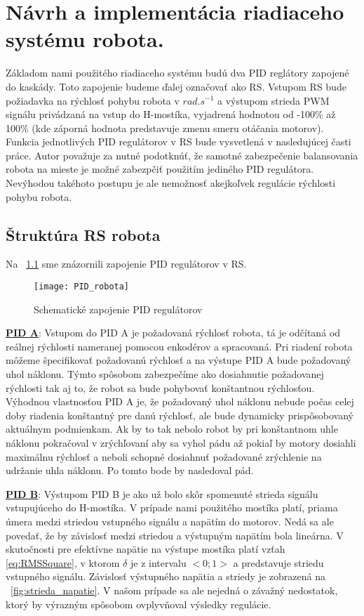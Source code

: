 \chapter{Návrh a implementácia riadiaceho systému robota.}
Základom nami použitého riadiaceho systému budú dva PID reglátory zapojené do kaskády. Toto zapojenie budeme ďalej označovať ako \ac{RS}. Vstupom RS bude požiadavka na rýchlosť pohybu robota v $rad.s^{-1}$ a výstupom strieda PWM signálu privádzaná na vstup do H-mostíka, vyjadrená hodnotou od -100\% až 100\% (kde záporná hodnota predstavuje zmenu smeru otáčania motorov). Funkcia jednotlivých PID regulátorov v RS bude vysvetlená v nasledujúcej časti práce. Autor považuje za nutné podotknúť, že samotné zabezpečenie balansovania robota na mieste je možné zabezpčiť použitím jediného PID regulátora. Nevýhodou takéhoto postupu je ale nemožnosť akejkoľvek regulácie rýchlosti pohybu robota. 

\section{Štruktúra RS robota}

Na \figurename~\ref{fig:RS} sme znázornili zapojenie PID regulátorov v RS.  

\begin{figure}
\centering
\texttt{[image: PID\_robota]}
\caption{Schematické zapojenie PID regulátorov}
\label{fig:RS}
\end{figure}

\underline{\textbf{PID A}}:
Vstupom do PID A je požadovaná rýchlosť robota, tá je odčítaná od reálnej rýchlosti nameranej pomocou enkodérov a spracovaná. Pri riadení robota môžeme špecifikovať požadovanú rýchlosť a na výstupe  PID A bude požadovaný uhol náklonu. Týmto spôsobom zabezpečíme ako dosiahnutie požadovanej rýchlosti tak aj to, že robot sa bude pohybovať konštantnou rýchlosťou. Výhodnou vlastnosťou PID A je, že požadovaný uhol náklonu nebude počas celej doby riadenia konštantný pre danú rýchlosť, ale bude dynamicky prispôsobovaný aktuálnym podmienkam. Ak by to tak nebolo robot by pri konštantnom uhle náklonu pokračoval v zrýchľovaní aby sa vyhol pádu až pokiaľ by motory dosiahli maximálnu rýchlosť a neboli schopné dosiahnuť požadované zrýchlenie na udržanie uhla náklonu. Po tomto bode by nasledoval pád.

\underline{\textbf{PID B}}:
Výstupom PID B je ako už bolo skôr spomenuté strieda signálu vstupujúceho do H-mostíka. V prípade nami použitého mostíka platí, priama úmera medzi striedou vstupného signálu a napätím do motorov. Nedá sa ale povedať, že by závislosť medzi striedou a výstupným napätím bola lineárna. V skutočnosti pre efektívne napätie na výstupe mostíka platí vzťah \eqref{eq:RMSSquare}, v ktorom $\delta$ je z intervalu $<0;1>$ a predstavuje striedu vstupného signálu. Závislosť výstupného napätia a striedy je zobrazená na \figurename~\ref{fig:strieda_napatie}. V našom prípade sa ale nejedná o závažný nedostatok, ktorý by výrazným spôsobom ovplyvňoval výsledky regulácie.

